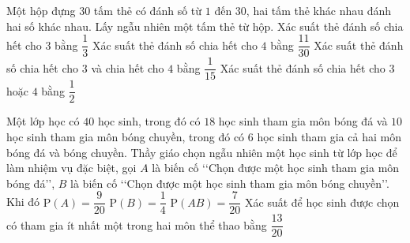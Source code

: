 \begin{ex}%
 Một hộp đựng $30$ tấm thẻ có đánh số từ $1$ đến $30$, hai tấm thẻ khác nhau  đánh hai số khác nhau. Lấy ngẫu nhiên một tấm thẻ từ hộp.
 \choiceTF 
  {\True Xác suất thẻ đánh số  chia hết cho $3$ bằng $\dfrac{1}{3}$}
  {Xác suất thẻ đánh số chia hết cho $4$ bằng $\dfrac{11}{30}$} 
  {\True Xác suất thẻ đánh số chia hết cho $3$ và chia  hết cho $4$ bằng $\dfrac{1}{15}$}
   {\True Xác suất thẻ đánh số chia hết cho $3$ hoặc $4$ bằng $\dfrac{1}{2}$}
\end{ex}

\begin{ex}%
 Một lớp học có $40$ học sinh, trong đó có $18$ học sinh tham gia môn bóng đá và $10$ học sinh tham gia môn bóng chuyền, trong đó có $6$ học sinh tham gia cả hai môn bóng đá và bóng chuyền. Thầy giáo chọn ngẫu nhiên một học sinh từ lớp học để làm nhiệm vụ đặc biệt, gọi $A$ là biến cố \lq\lq Chọn được một học sinh tham gia môn bóng đá\rq\rq, $B$ là biến cố \lq\lq Chọn được một học sinh tham gia môn bóng chuyền\rq\rq. Khi  đó
  \choiceTF
  {\True  $\mathrm{P}(A)=\dfrac{9}{20}$}
  {\True  $\mathrm{P}(B)=\dfrac{1}{4}$}
   {$\mathrm{P}(AB)=\dfrac{7}{20}$}
  {Xác suất  để học sinh được chọn có tham gia ít nhất một trong hai môn thể thao bằng $\dfrac{13}{20}$}
\end{ex}

